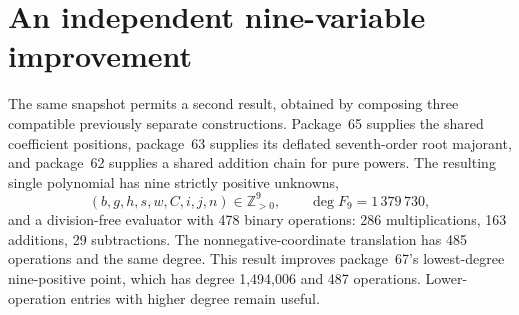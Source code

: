 \section{An independent nine-variable improvement}
\label{sec:nine-composition}

The same snapshot permits a second result, obtained by composing three
compatible previously separate constructions. Package~65 supplies the shared
coefficient positions, package~63 supplies its deflated seventh-order root
majorant, and package~62 supplies a shared addition chain for pure powers.
The resulting single polynomial has nine strictly positive unknowns,
\[
 (b,g,h,s,w,C,i,j,n)\in\mathbb Z_{>0}^{9},
 \qquad \deg F_9=1\,379\,730,
\]
and a division-free evaluator with 478 binary operations:
286 multiplications, 163 additions, 29 subtractions. The nonnegative-coordinate
translation has 485 operations and the same degree. This result improves
package~67's lowest-degree nine-positive point, which has degree 1,494,006
and 487 operations. Lower-operation entries with higher degree remain useful.

